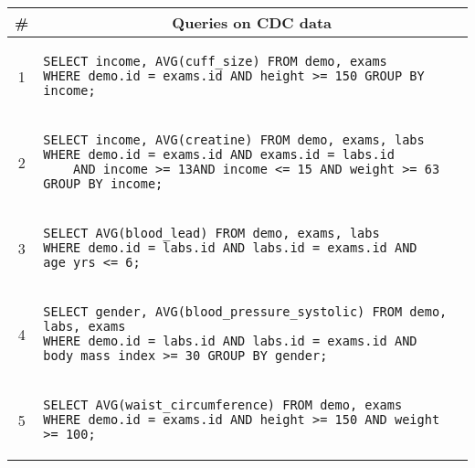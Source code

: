 {
  \lstset{breaklines=true, basicstyle=\scriptsize\ttfamily}
\begin{tabular}{cl}
  \toprule
  \# & \multicolumn{1}{c}{Queries on CDC data} \\
  \midrule
  1 & 
      \begin{minipage}{6in}
\begin{lstlisting}[breaklines, basicstyle=\scriptsize\ttfamily]
SELECT income, AVG(cuff_size) FROM demo, exams 
WHERE demo.id = exams.id AND height >= 150 GROUP BY income;
\end{lstlisting}
      \end{minipage}{queryno}\label[query]{q1} \\[-1.5ex]
  2 & 
      \begin{minipage}{6in}
\begin{lstlisting}[breaklines, basicstyle=\scriptsize\ttfamily]
SELECT income, AVG(creatine) FROM demo, exams, labs
WHERE demo.id = exams.id AND exams.id = labs.id
    AND income >= 13AND income <= 15 AND weight >= 63 GROUP BY income;
\end{lstlisting}
      \end{minipage}
      {queryno}\label[query]{q2} \\[-1.5ex]
  3 & 
      \begin{minipage}{6in}
\begin{lstlisting}[breaklines]
SELECT AVG(blood_lead) FROM demo, exams, labs 
WHERE demo.id = labs.id AND labs.id = exams.id AND age_yrs <= 6;
\end{lstlisting}
      \end{minipage}{queryno}\label[query]{q3}\\[-1.5ex]
  4 & 
      \begin{minipage}{6in}
\begin{lstlisting}[breaklines]
SELECT gender, AVG(blood_pressure_systolic) FROM demo, labs, exams 
WHERE demo.id = labs.id AND labs.id = exams.id AND body_mass_index >= 30 GROUP BY gender;
\end{lstlisting}
      \end{minipage}{queryno}\label[query]{q4}\\[-1.5ex]
  5 & 
      \begin{minipage}{6in}
\begin{lstlisting}[breaklines]
SELECT AVG(waist_circumference) FROM demo, exams 
WHERE demo.id = exams.id AND height >= 150 AND weight >= 100;
\end{lstlisting}

\end{minipage}
\end{tabular}}
